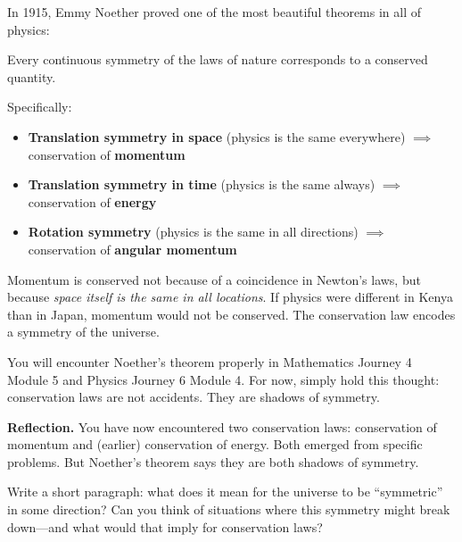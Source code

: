 \documentclass[12pt, a4paper, twoside]{book}
\newcounter{problem}[chapter]
\theoremstyle{disc}
\begin{document}
In 1915, Emmy Noether proved one of the most beautiful theorems in all of physics:

\begin{tcolorbox}[colback=purple!5, colframe=purple, fonttitle=\bfseries\color{white},
  coltitle=white, title={Noether's Theorem (preview)}]
Every continuous symmetry of the laws of nature corresponds to a conserved quantity.

\medskip
Specifically:
\begin{itemize}
  \item \textbf{Translation symmetry in space} (physics is the same everywhere) $\implies$ conservation of \textbf{momentum}
  \item \textbf{Translation symmetry in time} (physics is the same always) $\implies$ conservation of \textbf{energy}
  \item \textbf{Rotation symmetry} (physics is the same in all directions) $\implies$ conservation of \textbf{angular momentum}
\end{itemize}
\end{tcolorbox}

Momentum is conserved not because of a coincidence in Newton's laws, but because \textit{space itself is the same in all locations}. If physics were different in Kenya than in Japan, momentum would not be conserved. The conservation law encodes a symmetry of the universe.

You will encounter Noether's theorem properly in Mathematics Journey 4 Module 5 and Physics Journey 6 Module 4. For now, simply hold this thought: conservation laws are not accidents. They are shadows of symmetry.

\begin{reflectionbox}
\textbf{Reflection.} You have now encountered two conservation laws: conservation of momentum and (earlier) conservation of energy. Both emerged from specific problems. But Noether's theorem says they are both shadows of symmetry.

Write a short paragraph: what does it mean for the universe to be ``symmetric'' in some direction? Can you think of situations where this symmetry might break down---and what would that imply for conservation laws?
\end{reflectionbox}

\end{document}

